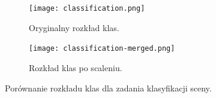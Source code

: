 \begin{figure}
\centering
\begin{subfigure}[b]{0.49\textwidth}
\centering
\texttt{[image: classification.png]}
\caption{Oryginalny rozkład klas.}
\label{fig:27 klas dystrybucja}
\end{subfigure}
\hfill
\begin{subfigure}[b]{0.49\textwidth}
\centering
\texttt{[image: classification-merged.png]}
\caption{Rozkład klas po scaleniu.}
\label{fig:7 klas dystrybucja}
\end{subfigure}
\caption[]{Porównanie rozkładu klas dla zadania klasyfikacji sceny.}
\end{figure}






































